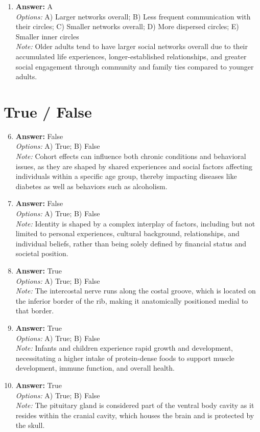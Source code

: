\documentclass[12pt]{article}
\begin{document}
\begin{enumerate}[label=\arabic*.]
\item \textbf{Answer:} A
\\ \textit{Options:} A) Larger networks overall; B) Less frequent communication with their circles; C) Smaller networks overall; D) More dispersed circles; E) Smaller inner circles
\\ \textit{Note:} Older adults tend to have larger social networks overall due to their accumulated life experiences, longer-established relationships, and greater social engagement through community and family ties compared to younger adults.
\end{enumerate}

\section*{True / False}
\begin{enumerate}[label=\arabic*.]
\setcounter{enumi}{5}
\item \textbf{Answer:} False
\\ \textit{Options:} A) True; B) False
\\ \textit{Note:} Cohort effects can influence both chronic conditions and behavioral issues, as they are shaped by shared experiences and social factors affecting individuals within a specific age group, thereby impacting diseases like diabetes as well as behaviors such as alcoholism.
\item \textbf{Answer:} False
\\ \textit{Options:} A) True; B) False
\\ \textit{Note:} Identity is shaped by a complex interplay of factors, including but not limited to personal experiences, cultural background, relationships, and individual beliefs, rather than being solely defined by financial status and societal position.
\item \textbf{Answer:} True
\\ \textit{Options:} A) True; B) False
\\ \textit{Note:} The intercostal nerve runs along the costal groove, which is located on the inferior border of the rib, making it anatomically positioned medial to that border.
\item \textbf{Answer:} True
\\ \textit{Options:} A) True; B) False
\\ \textit{Note:} Infants and children experience rapid growth and development, necessitating a higher intake of protein-dense foods to support muscle development, immune function, and overall health.
\item \textbf{Answer:} True
\\ \textit{Options:} A) True; B) False
\\ \textit{Note:} The pituitary gland is considered part of the ventral body cavity as it resides within the cranial cavity, which houses the brain and is protected by the skull.
\end{enumerate}
\end{document}
